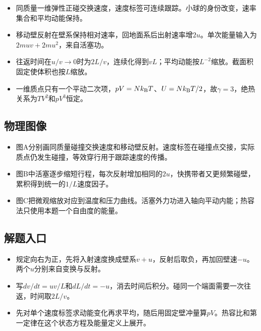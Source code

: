 \documentclass[UTF8,fontset=fandol,a4paper,11pt]{ctexart}
\begin{document}
\begin{itemize}
\item 同质量一维弹性正碰交换速度，速度标签可连续跟踪。小球的身份改变，速率集合和平均动能保持。
\item 移动壁反射在壁系保持相对速率，回地面系后出射速率增$2u$。单次能量输入为$2muv+2mu^2$，来自活塞功。
\item 往返时间在$u/v\to0$时为$2L/v$，连续化得到$vL$；平均动能按$L^{-2}$缩放。截面积固定使体积也按$L$缩放。
\item 一维质点只有一个平动二次项，$pV=Nk_{\rm B}T$、$U=Nk_{\rm B}T/2$，故$\gamma=3$，绝热关系为$TV^2$和$pV^3$恒定。
\end{itemize}



\subsection*{物理图像}

\begin{itemize}
\item 图A分别画同质量碰撞交换速度和移动壁反射。速度标签在碰撞点交接，实际质点仍发生碰撞，等效穿行用于跟踪速度的传播。
\item 图B中活塞逐步缩短行程，每次反射增加相同的$2u$，快携带者又更频繁碰壁，累积得到统一的$1/L$速度因子。
\item 图C把微观缩放对应到温度和压力曲线。活塞外力功进入轴向平动内能；热容法只使用本题一个自由度的能量。
\end{itemize}



\subsection*{解题入口}

\begin{itemize}
\item 规定向右为正，先将入射速度换成壁系$v+u$，反射后取负，再加回壁速$-u$。两个$u$分别来自变换与反射。
\item 写$dv/dt=uv/L$和$dL/dt=-u$，消去时间后积分。碰同一个端面需要一次往返，时间取$2L/v$。
\item 先对单个速度标签求动能变化再求平均，随后用固定壁冲量算$pV$。热容比和第一定律在这个状态方程及能量定义上展开。
\end{itemize}
\end{document}
